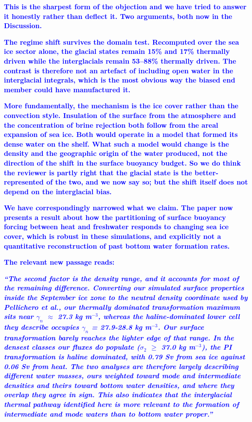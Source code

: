 \documentclass[pdflatex,sn-nature]{sn-jnl}
\begin{document}
\noindent\textcolor{blue}{\textbf{This is the sharpest form of the objection and we have tried to answer it honestly rather than deflect it. Two arguments, both now in the Discussion.}}


\noindent\textcolor{blue}{\textbf{The regime shift survives the domain test. Recomputed over the sea ice sector alone, the glacial states remain 15\% and 17\% thermally driven while the interglacials remain 53--88\% thermally driven. The contrast is therefore not an artefact of including open water in the interglacial integrals, which is the most obvious way the biased end member could have manufactured it.}}


\noindent\textcolor{blue}{\textbf{More fundamentally, the mechanism is the ice cover rather than the convection style. Insulation of the surface from the atmosphere and the concentration of brine rejection both follow from the areal expansion of sea ice. Both would operate in a model that formed its dense water on the shelf. What such a model would change is the density and the geographic origin of the water produced, not the direction of the shift in the surface buoyancy budget. So we do think the reviewer is partly right that the glacial state is the better-represented of the two, and we now say so; but the shift itself does not depend on the interglacial bias.}}


\noindent\textcolor{blue}{\textbf{We have correspondingly narrowed what we claim. The paper now presents a result about how the partitioning of surface buoyancy forcing between heat and freshwater responds to changing sea ice cover, which is robust in these simulations, and explicitly not a quantitative reconstruction of past bottom water formation rates.}}


\noindent\textcolor{blue}{\textbf{The relevant new passage reads:}}


\medskip
\noindent\textcolor{blue}{\textbf{\textit{``The second factor is the density range, and it accounts for most of the remaining difference. Converting our simulated surface properties inside the September ice zone to the neutral density coordinate used by Pellichero et al., our thermally dominated transformation maximum sits near $\gamma_n$ $\approx$ 27.3 kg m$^{-3}$, whereas the haline-dominated lower cell they describe occupies $\gamma_n$ = 27.9-28.8 kg m$^{-3}$. Our surface transformation barely reaches the lighter edge of that range. In the densest classes our fluxes do populate ($\sigma$$_2$ $\ge$ 37.0 kg m$^{-3}$), the PI transformation is haline dominated, with 0.79 Sv from sea ice against 0.06 Sv from heat. The two analyses are therefore largely describing different water masses, ours weighted toward mode and intermediate densities and theirs toward bottom water densities, and where they overlap they agree in sign. This also indicates that the interglacial thermal pathway identified here is more relevant to the formation of intermediate and mode waters than to bottom water proper.''}}}
\medskip
\end{document}
